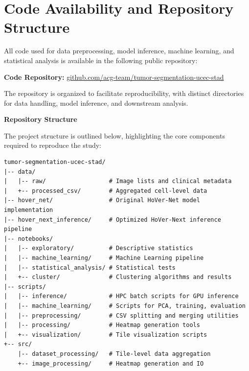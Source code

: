 


\chapter*{Code Availability and Repository Structure} %


All code used for data preprocessing, model inference, machine learning, and statistical analysis is available in the following public repository:

\textbf{Code Repository:} \href{https://github.com/acg-team/tumor-segmentation-ucec-stad/tree/master}{github.com/acg-team/tumor-segmentation-ucec-stad}

The repository is organized to facilitate reproducibility, with distinct directories for data handling, model inference, and downstream analysis.

\textbf{\Large Repository Structure}

The project structure is outlined below, highlighting the core components required to reproduce the study:


\begin{small}
\begin{verbatim}
tumor-segmentation-ucec-stad/
|-- data/
|   |-- raw/                  # Image lists and clinical metadata
|   +-- processed_csv/        # Aggregated cell-level data
|-- hover_net/                # Original HoVer-Net model implementation
|-- hover_next_inference/     # Optimized HoVer-Next inference pipeline
|-- notebooks/
|   |-- exploratory/          # Descriptive statistics
|   |-- machine_learning/     # Machine Learning pipeline
|   |-- statistical_analysis/ # Statistical tests
|   +-- cluster/              # Clustering algorithms and results
|-- scripts/
|   |-- inference/            # HPC batch scripts for GPU inference
|   |-- machine_learning/     # Scripts for PCA, training, evaluation
|   |-- preprocessing/        # CSV splitting and merging utilities
|   |-- processing/           # Heatmap generation tools
|   +-- visualization/        # Tile visualization scripts
+-- src/
    |-- dataset_processing/   # Tile-level data aggregation
    +-- image_processing/     # Heatmap generation and IO
\end{verbatim}
\end{small}


